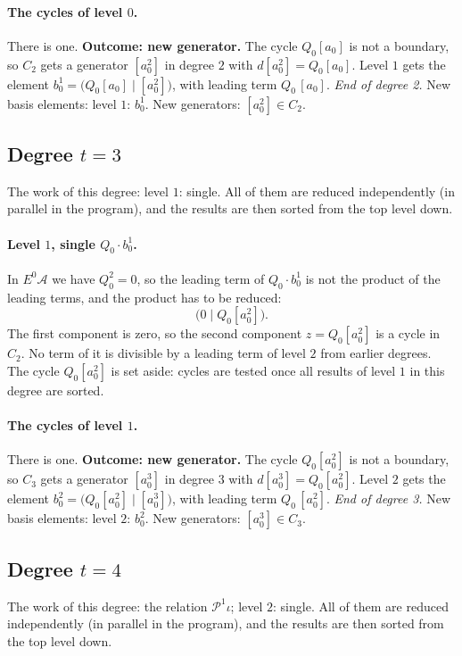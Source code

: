 \documentclass[11pt]{article}
\renewcommand{\P}{\mathcal{P}}
\newcommand{\A}{\mathcal{A}}
\begin{document}
\paragraph{The cycles of level $0$.} There is one.
\textbf{Outcome: new generator.} The cycle $Q_{0}[a_0]$ is not a boundary, so $C_{2}$ gets a generator $[a_0^2]$ in degree $2$ with $d[a_0^2] = Q_{0}[a_0]$.
Level $1$ gets the element $b^{1}_{0} = \bigl(Q_{0}[a_0] \;\big|\; [a_0^2]\bigr)$, with leading term $Q_{0}\,[a_0]$.
\medskip\noindent\emph{End of degree 2.} New basis elements: level $1$: $b^{1}_{0}$. New generators: $[a_0^2]\in C_{2}$.
\subsection*{Degree $t = 3$}
\noindent The work of this degree: level $1$: single. All of them are reduced independently (in parallel in the program), and the results are then sorted from the top level down.
\medskip
\paragraph{Level $1$, single $Q_{0}\cdot b^{1}_{0}$.} In $E^0\A$ we have $Q_{0}^2 = 0$, so the leading term of $Q_{0}\cdot b^{1}_{0}$ is not the product of the leading terms, and the product has to be reduced:
\[\bigl(0 \;\big|\; Q_{0}[a_0^2]\bigr).\]
The first component is zero, so the second component $z = Q_{0}[a_0^2]$ is a cycle in $C_{2}$.
No term of it is divisible by a leading term of level $2$ from earlier degrees.
The cycle $Q_{0}[a_0^2]$ is set aside: cycles are tested once all results of level $1$ in this degree are sorted.
\medskip
\paragraph{The cycles of level $1$.} There is one.
\textbf{Outcome: new generator.} The cycle $Q_{0}[a_0^2]$ is not a boundary, so $C_{3}$ gets a generator $[a_0^3]$ in degree $3$ with $d[a_0^3] = Q_{0}[a_0^2]$.
Level $2$ gets the element $b^{2}_{0} = \bigl(Q_{0}[a_0^2] \;\big|\; [a_0^3]\bigr)$, with leading term $Q_{0}\,[a_0^2]$.
\medskip\noindent\emph{End of degree 3.} New basis elements: level $2$: $b^{2}_{0}$. New generators: $[a_0^3]\in C_{3}$.
\subsection*{Degree $t = 4$}
\noindent The work of this degree: the relation $\P^{1}\iota$; level $2$: single. All of them are reduced independently (in parallel in the program), and the results are then sorted from the top level down.
\medskip
\end{document}
